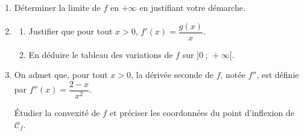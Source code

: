 \begin{enumerate}
\item Déterminer la limite de $f$ en $+ \infty$ en justifiant votre démarche.
\item 
	\begin{enumerate}
		\item Justifier que pour tout $x > 0$,\: $f'(x) = \dfrac{g(x)}{x}$.
		\item En déduire le tableau des variations de $f$ sur $]0~;~ +\infty[$.
	\end{enumerate}	
\item On admet que, pour tout $x > 0$, la dérivée seconde de $f$, notée $f''$, est définie par $f''(x) = \dfrac{2 - x}{x^2}$.

Étudier la convexité de $f$ et préciser les coordonnées du point
 d'inflexion de $\mathcal{C}_f$.
\end{enumerate}

\bigskip
